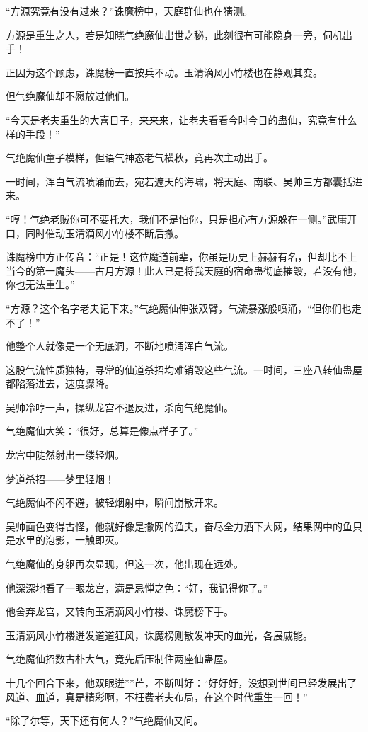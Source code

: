 \begin{this_body}
“方源究竟有没有过来？”诛魔榜中，天庭群仙也在猜测。

方源是重生之人，若是知晓气绝魔仙出世之秘，此刻很有可能隐身一旁，伺机出手！

正因为这个顾虑，诛魔榜一直按兵不动。玉清滴风小竹楼也在静观其变。

但气绝魔仙却不愿放过他们。

“今天是老夫重生的大喜日子，来来来，让老夫看看今时今日的蛊仙，究竟有什么样的手段！”

气绝魔仙童子模样，但语气神态老气横秋，竟再次主动出手。

一时间，浑白气流喷涌而去，宛若遮天的海啸，将天庭、南联、吴帅三方都囊括进来。

“哼！气绝老贼你可不要托大，我们不是怕你，只是担心有方源躲在一侧。”武庸开口，同时催动玉清滴风小竹楼不断后撤。

诛魔榜中方正传音：“正是！这位魔道前辈，你虽是历史上赫赫有名，但却比不上当今的第一魔头——古月方源！此人已是将我天庭的宿命蛊彻底摧毁，若没有他，你也无法重生。”

“方源？这个名字老夫记下来。”气绝魔仙伸张双臂，气流暴涨般喷涌，“但你们也走不了！”

他整个人就像是一个无底洞，不断地喷涌浑白气流。

这股气流性质独特，寻常的仙道杀招均难销毁这些气流。一时间，三座八转仙蛊屋都陷落进去，速度骤降。

吴帅冷哼一声，操纵龙宫不退反进，杀向气绝魔仙。

气绝魔仙大笑：“很好，总算是像点样子了。”

龙宫中陡然射出一缕轻烟。

梦道杀招——梦里轻烟！

气绝魔仙不闪不避，被轻烟射中，瞬间崩散开来。

吴帅面色变得古怪，他就好像是撒网的渔夫，奋尽全力洒下大网，结果网中的鱼只是水里的泡影，一触即灭。

气绝魔仙的身躯再次显现，但这一次，他出现在远处。

他深深地看了一眼龙宫，满是忌惮之色：“好，我记得你了。”

他舍弃龙宫，又转向玉清滴风小竹楼、诛魔榜下手。

玉清滴风小竹楼迸发道道狂风，诛魔榜则散发冲天的血光，各展威能。

气绝魔仙招数古朴大气，竟先后压制住两座仙蛊屋。

十几个回合下来，他双眼迸**芒，不断叫好：“好好好，没想到世间已经发展出了风道、血道，真是精彩啊，不枉费老夫布局，在这个时代重生一回！”

“除了尔等，天下还有何人？”气绝魔仙又问。


\end{this_body}
